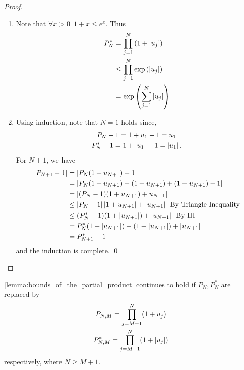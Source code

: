 \documentclass[notoc,notitlepage]{tufte-book}
\begin{document}
\begin{proof}
  \begin{enumerate}
    \item Note that $\forall x > 0 \enspace 1 + x \leq e^x$. Thus
      \begin{align*}
        P_N^* &= \prod_{j=1}^{N} \left(1 + \left|u_j\right| \right) \\
          &\leq \prod_{j=1}^{N} \exp{(\left|u_j\right|)} \\
          &= \exp{\left( \sum_{j=1}^{N} \left|u_j\right| \right)}
      \end{align*}

    \item Using induction, note that $N = 1$ holds since,
    \begin{gather*}
      P_N - 1 = 1 + u_1 - 1 = u_1 \\
      P_N^* - 1 = 1 + \left|u_1\right| - 1 = \left|u_1\right|.
    \end{gather*}
      For $N + 1$, we have
      \begin{align*}
        \left|P_{N + 1} - 1\right| &= \left|P_N ( 1 + u_{N + 1} ) - 1\right| \\
          &= \left|P_N (1 + u_{N + 1} ) - (1 + u_{N + 1} ) + (1 + u_{N + 1} ) - 1\right| \\
          &= \left|(P_N - 1)(1 + u_{N + 1}) + u_{N + 1}\right| \\
          &\leq \left|P_N - 1\right| \left|1 + u_{N + 1}\right| + \left|u_{N + 1}\right| \enspace \text{By Triangle Inequality} \\
          &\leq (P_N^* - 1)(1 + \left|u_{N + 1}\right|) + \left|u_{N + 1}\right| \enspace \text{By IH} \\
          &= P_N^* (1 + \left|u_{N + 1}\right|) - (1 + \left|u_{N + 1}\right|) + \left|u_{N + 1}\right| \\
          &= P_{N + 1}^* - 1
      \end{align*}
      and the induction is complete. \qed
  \end{enumerate}
\end{proof}

\begin{remark}
  \cref{lemma:bounds_of_the_partial_product} continues to hold if $P_N, P_N^*$ are replaced by
  \begin{gather*}
    P_{N, M} = \prod_{j=M + 1}^{N} (1 + u_j) \\
    P_{N, M}^* = \prod_{j=M + 1}^{N} (1 + \left|u_j\right|)
  \end{gather*}
  respectively, where $N \geq M + 1$.
\end{remark}
\end{document}

